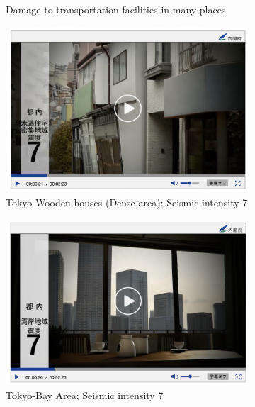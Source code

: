 \begin{figure}[h]
\begin{subfigure}{0.32\textwidth}
    \caption{Damage to transportation facilities in many places}
    \label{fig5c}
  \end{subfigure}\hfill
  \begin{subfigure}{0.32\textwidth}
    \centering
    \includegraphics[width=\linewidth]{Figure/Figure5d.jpg}
    \caption{Tokyo-Wooden houses (Dense area); Seismic intensity 7}
    \label{fig5d}
  \end{subfigure}\hfill
  \begin{subfigure}{0.32\textwidth}
    \centering
    \includegraphics[width=\linewidth]{Figure/Figure5e.jpg}
    \caption{Tokyo-Bay Area; Seismic intensity 7}
    \label{fig5e}
  \end{subfigure}\hfill
  \begin{subfigure}{0.32\textwidth}
    \centering

\end{subfigure}
\end{figure}
